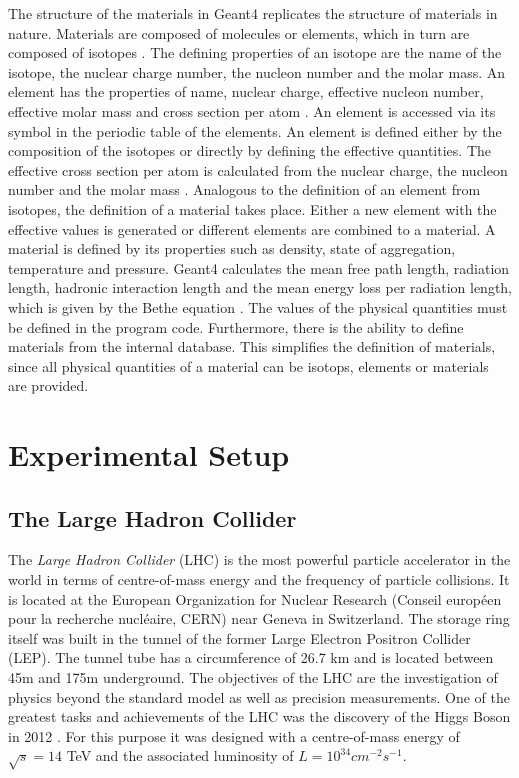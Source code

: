 \documentclass[12pt, a4paper]{thesis}
\begin{document}
The structure of the materials in Geant4 replicates the structure of materials
in nature. Materials are composed of molecules or elements, which in turn are
composed of isotopes \cite{geant_simul_toolk} . The defining properties of an isotope are the name
of the isotope, the nuclear charge number, the nucleon number and the molar
mass. An element has the properties of name, nuclear charge, effective nucleon
number, effective molar mass and cross section per atom \cite{geant4-doc}. An element is
accessed via its symbol in the periodic table of the elements.  An element is
defined either by the composition of the isotopes or directly by defining the
effective quantities. The effective cross section per atom is calculated from
the nuclear charge, the nucleon number and the molar mass \cite{geant4-doc}. Analogous to
the definition of an element from isotopes, the definition of a material takes
place.  Either a new element with the effective values is generated or different
elements are combined to a material. A material is defined by its properties
such as density, state of aggregation, temperature and pressure. Geant4
calculates the mean free path length, radiation length, hadronic interaction
length and the mean energy loss per radiation length, which is given by the
Bethe equation \cite{geant4-doc}. The values of the physical quantities must be defined in
the program code. Furthermore, there is the ability to define materials from the
internal database. This simplifies the definition of materials, since all
physical quantities of a material can be isotops, elements or materials are
provided.

\chapter{Experimental Setup}
\label{sec:org5cd8e52}
\section{The Large Hadron Collider}
\label{sec:orgf5b86e0}
The \emph{Large Hadron Collider} (LHC) \cite{lhc_machine} is the most powerful particle
accelerator in the world in terms of centre-of-mass energy and the frequency of
particle collisions. It is located at the European Organization for Nuclear
Research (Conseil européen pour la recherche nucléaire, CERN) near Geneva in
Switzerland. The storage ring itself was built in the tunnel of the former Large
Electron Positron Collider (LEP). The tunnel tube has a circumference of 26.7 km
and is located between 45m and 175m underground. The objectives of the LHC are
the investigation of physics beyond the standard model as well as precision
measurements. One of the greatest tasks and achievements of the LHC was the
discovery of the Higgs Boson in 2012 \cite{higgs_cms,higgs_atlas}. For this
purpose it was designed with a centre-of-mass energy of \(\sqrt{s} = 14\) TeV and
the associated luminosity of \(L = 10^{34} cm^{-2}s^{-1}\). 
\end{document}
